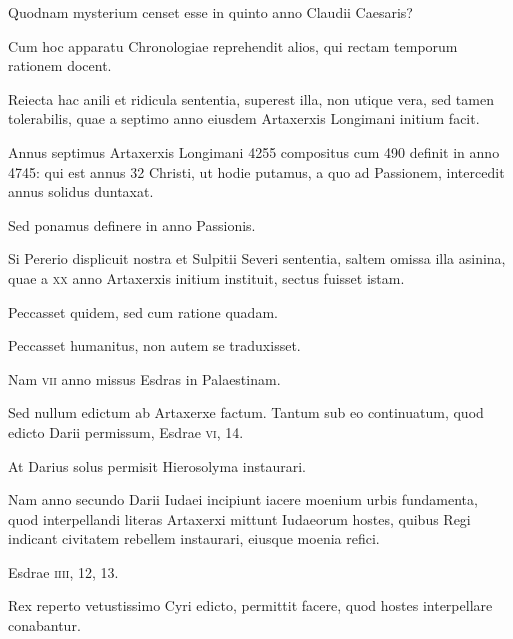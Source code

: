\begin{parnumbers}
Quodnam mysterium censet esse in quinto anno Claudii Caesaris?

Cum hoc apparatu Chronologiae reprehendit alios, qui rectam
temporum rationem docent.

Reiecta hac anili et ridicula sententia,
superest illa, non utique vera, sed tamen tolerabilis, quae a
septimo anno eiusdem Artaxerxis Longimani initium facit.

Annus septimus Artaxerxis Longimani 4255 compositus cum 490
definit in anno 4745: qui est annus 32 Christi, ut hodie putamus,
a quo ad Passionem, intercedit annus solidus duntaxat.

Sed
ponamus definere in anno Passionis.

Si Pererio displicuit nostra et
Sulpitii Severi sententia, saltem omissa illa asinina, quae a \textsc{xx} anno
Artaxerxis initium instituit, sectus fuisset istam.

Peccasset quidem,
sed cum ratione quadam.

Peccasset humanitus, non autem
se traduxisset.

Nam \textsc{vii} anno missus Esdras in Palaestinam.

Sed nullum edictum ab Artaxerxe factum. Tantum sub eo continuatum,
quod edicto Darii permissum, Esdrae \textsc{vi}, 14.

At Darius
solus permisit Hierosolyma instaurari.

Nam anno secundo Darii
Iudaei incipiunt iacere moenium urbis fundamenta, quod interpellandi
literas Artaxerxi mittunt Iudaeorum hostes, quibus Regi indicant
civitatem rebellem instaurari, eiusque moenia refici.

Esdrae \textsc{iiii}, 12, 13.

Rex reperto vetustissimo Cyri edicto, permittit facere,
quod hostes interpellare conabantur.


\end{parnumbers}
